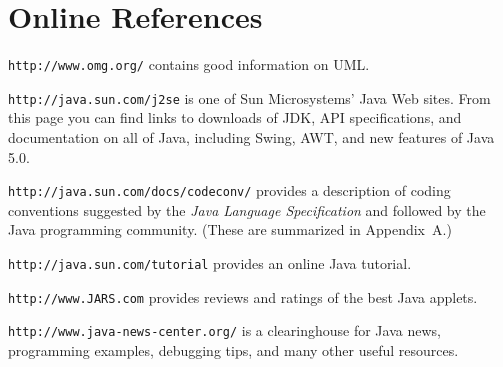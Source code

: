 \section*{Online References}
\begin{BL} 

\item  {\tt http://www.omg.org/} contains good information on UML.

\item  {\tt http://java.sun.com/j2se} is one of Sun
Microsystems' Java Web sites.  From this page you can find links
to downloads of JDK, API specifications, and documentation
on all of Java, including Swing, AWT, and new features of
Java 5.0.

\item  {\tt http://java.sun.com/docs/codeconv/} provides a
description of coding conventions suggested by the {\it Java Language
Specification} and followed by the Java programming community.
(These are summarized in Appendix~A.)

\item  {\tt http://java.sun.com/tutorial} provides an online
Java tutorial.

\item  {\tt http://www.JARS.com} provides reviews and 
ratings of the best Java applets.

\item {\tt http://www.java-news-center.org/} is a clearinghouse for
Java news, programming examples, debugging tips, and many other useful
resources.

\end{BL}
%
